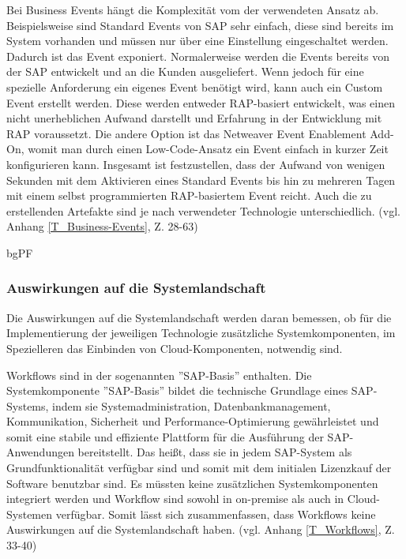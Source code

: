 Bei Business Events hängt die Komplexität vom der verwendeten Ansatz ab. Beispielsweise sind Standard Events von SAP sehr einfach, diese sind bereits im System vorhanden und müssen nur über eine Einstellung eingeschaltet werden. Dadurch ist das Event exponiert. Normalerweise werden die Events bereits von der SAP entwickelt und an die Kunden ausgeliefert. Wenn jedoch für eine spezielle Anforderung ein eigenes Event benötigt wird, kann auch ein Custom Event erstellt werden. Diese werden entweder RAP-basiert entwickelt, was einen nicht unerheblichen Aufwand darstellt und Erfahrung in der Entwicklung mit RAP voraussetzt. Die andere Option ist das Netweaver Event Enablement Add-On, womit man durch einen Low-Code-Ansatz ein Event einfach in kurzer Zeit konfigurieren kann. Insgesamt ist festzustellen, dass der Aufwand von wenigen Sekunden mit dem Aktivieren eines Standard Events bis hin zu mehreren Tagen mit einem selbst programmierten RAP-basiertem Event reicht. Auch die zu erstellenden Artefakte sind je nach verwendeter Technologie unterschiedlich. (vgl. Anhang \ref{T_Business-Events}, Z. 28-63)

bgPF

\subsubsection{Auswirkungen auf die Systemlandschaft}

Die Auswirkungen auf die Systemlandschaft werden daran bemessen, ob für die Implementierung der jeweiligen Technologie zusätzliche Systemkomponenten, im Spezielleren das Einbinden von Cloud-Komponenten, notwendig sind.

Workflows sind in der sogenannten ''SAP-Basis'' enthalten. Die Systemkomponente ''SAP-Basis'' bildet die technische Grundlage eines SAP-Systems, indem sie Systemadministration, Datenbankmanagement, Kommunikation, Sicherheit und Performance-Optimierung gewährleistet und somit eine stabile und effiziente Plattform für die Ausführung der SAP-Anwendungen bereitstellt. Das hei{\ss}t, dass sie in jedem SAP-System als Grundfunktionalität verfügbar sind und somit mit dem initialen Lizenzkauf der Software benutzbar sind. Es müssten keine zusätzlichen Systemkomponenten integriert werden und Workflow sind sowohl in on-premise als auch in Cloud-Systemen verfügbar. Somit lässt sich zusammenfassen, dass Workflows keine Auswirkungen auf die Systemlandschaft haben. (vgl. Anhang \ref{T_Workflows}, Z. 33-40)

